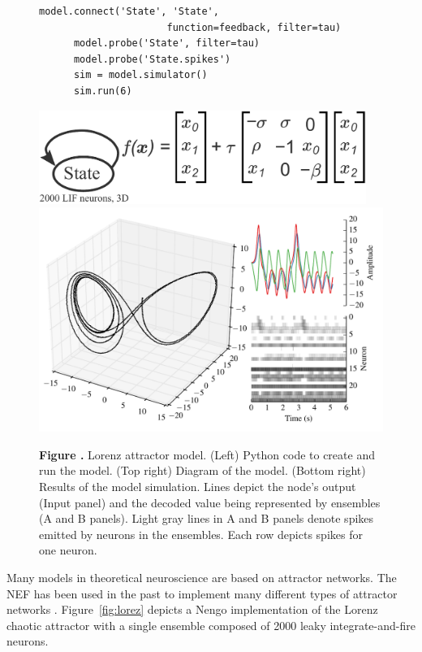 \documentclass{frontiersSCNS}
\begin{document}
\begin{figure}
\begin{center}
\begin{minipage}{0.43\textwidth}
\begin{lstlisting}[basicstyle={\footnotesize\ttfamily}]
      model.connect('State', 'State',
                      function=feedback, filter=tau)
      model.probe('State', filter=tau)
      model.probe('State.spikes')
      sim = model.simulator()
      sim.run(6)
    \end{lstlisting}
  \end{minipage}
  \begin{minipage}{0.55\textwidth}
    \includegraphics[width=0.95\textwidth]{lorenz}
    \includegraphics[width=\textwidth]{lorenz_res}
  \end{minipage}
\end{center}
 \textbf{\label{fig:lorenz} Figure .}{
   Lorenz attractor model. (Left) Python code to create and run the model.
   (Top right) Diagram of the model.
   (Bottom right) Results of the model simulation. Lines depict
   the node's output (Input panel) and the decoded value being represented
   by ensembles (A and B panels). Light gray lines in A and B panels denote
   spikes emitted by neurons in the ensembles. Each row depicts spikes
   for one neuron.}
\end{figure}

Many models in theoretical neuroscience
are based on attractor networks.
The NEF has been used in the past
to implement many different types of
attractor networks \cite{TODO}.
Figure~\ref{fig:lorez} depicts
a Nengo implementation of the Lorenz chaotic attractor
with a single ensemble
composed of 2000 leaky integrate-and-fire neurons.
\end{document}
